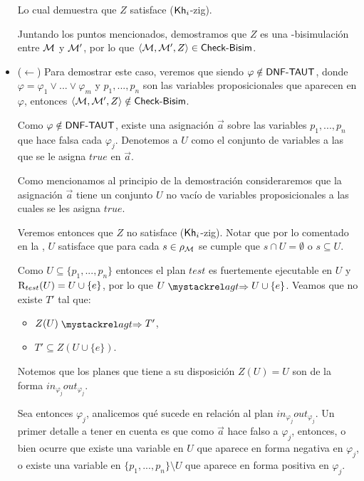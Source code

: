\begin{demostracion}
\begin{itemize}
    Lo cual demuestra que $Z$ satisface ($\mathsf{Kh}_i$-zig). 

    Juntando los puntos mencionados, demostramos que $Z$ es una \KHilogic-bisimulación entre $\mathcal{M}$ y $\mathcal{M}'$, 
    por lo que $\langle \mathcal{M},\mathcal{M}',Z \rangle \in \rm\textsf{Check-Bisim}$. 

    \item ($\leftarrow$) Para demostrar este caso, veremos que siendo $\varphi \notin \rm\textsf{DNF-TAUT}$, 
    donde $\varphi = \varphi_1 \vee ... \vee \varphi_m$ y $p_1,...,p_n$ son las variables proposicionales que aparecen en $\varphi$, 
    entonces $\langle \mathcal{M},\mathcal{M}',Z \rangle \notin \rm\textsf{Check-Bisim}$.

    Como $\varphi \notin \rm\textsf{DNF-TAUT}$, existe una asignación $\overrightarrow{a}$ sobre las variables $p_1,...,p_n$ que hace falsa 
    cada $\varphi_j$. Denotemos a $U$ como el conjunto de variables a las que se le asigna $true$ en $\overrightarrow{a}$.

    Como mencionamos al principio de la demostración consideraremos que la asignación $\overrightarrow{a}$ tiene un conjunto $U$ no vacío 
    de variables proposicionales a las cuales se les asigna $true$.
    
    Veremos entonces que $Z$ no satisface ($\mathsf{Kh}_i$-zig). Notar que por lo comentado en la , $U$ satisface que 
    para cada $s \in \rho_{\mathcal{M}}$ se cumple que $s \cap U = \emptyset$ o $s \subseteq U$. 

    Como $U \subseteq \{p_1,...,p_n\}$ entonces el plan $test$ es fuertemente ejecutable en $U$ y 
    $\mathrm{R}_{test}(U) = U \cup \{e\}$, por lo que $U \ultsExecAgagt U \cup \{e\}$.
    Veamos que no existe $T'$ tal que:
    \begin{multicols}{2}
        \begin{itemize}
            \item $Z(U) \ultsExecAgagt T'$, 
            \item $T' \subseteq Z(U \cup \{e\})$.
        \end{itemize}
    \end{multicols}

    Notemos que los planes que tiene a su disposición $Z(U) = U$ son de la forma $in_{\varphi_j}out_{\varphi_j}$.

    Sea entonces $\varphi_j$, analicemos qué sucede en relación al plan $in_{\varphi_j}out_{\varphi_j}$. 
    Un primer detalle a tener en cuenta es que como $\overrightarrow{a}$ hace falso a $\varphi_j$, entonces, 
    o bien ocurre que existe una variable en $U$ que aparece en forma negativa en $\varphi_j$, 
    o existe una variable en $\{p_1,...,p_n\}\setminus U$ que aparece en forma positiva en $\varphi_j$.


\end{itemize}
\end{demostracion}
